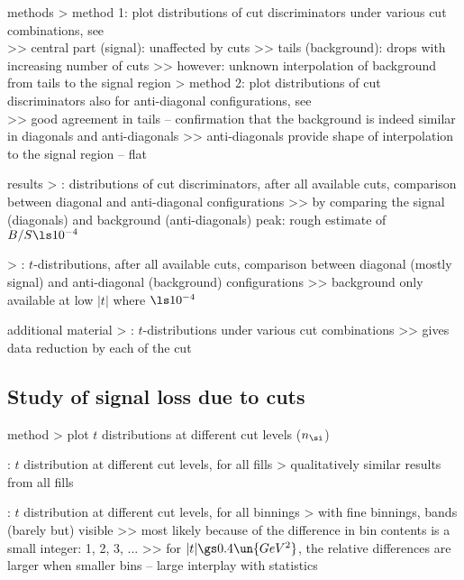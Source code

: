 \> methods
\>> method 1: plot distributions of cut discriminators under various cut combinations, see\\ 
\>>> central part (signal): unaffected by cuts
\>>> tails (background): drops with increasing number of cuts
\>>> however: unknown interpolation of background from tails to the signal region
\>> method 2: plot distributions of cut discriminators also for anti-diagonal configurations, see\\ 
\>>> good agreement in tails -- confirmation that the background is indeed similar in diagonals and anti-diagonals
\>>> anti-diagonals provide shape of interpolation to the signal region -- flat

\> results
\>> : distributions of cut discriminators, after all available cuts, comparison between diagonal and anti-diagonal configurations
\>>> by comparing the signal (diagonals) and background (anti-diagonals) peak: rough estimate of $B/S \ls 10^{-4}$

\>> : $t$-distributions, after all available cuts, comparison between diagonal (mostly signal) and anti-diagonal (background) configurations
\>>> background only available at low $|t|$ where $\ls 10^{-4}$

\> additional material
\>> : $t$-distributions under various cut combinations
\>>> gives data reduction by each of the cut

\subsection{Study of signal loss due to cuts}

\> method
\>> plot $t$ distributions at different cut levels ($n_\si$)

\> : $t$ distribution at different cut levels, for all fills
\>> qualitatively similar results from all fills

\> : $t$ distribution at different cut levels, for all binnings
\>> with fine binnings, bands (barely but) visible
\>>> most likely because of the difference in bin contents is a small integer: 1, 2, 3, ...
\>>> for $|t| \gs 0.4\un{GeV^2}$, the relative differences are larger when smaller bins -- large interplay with statistics

